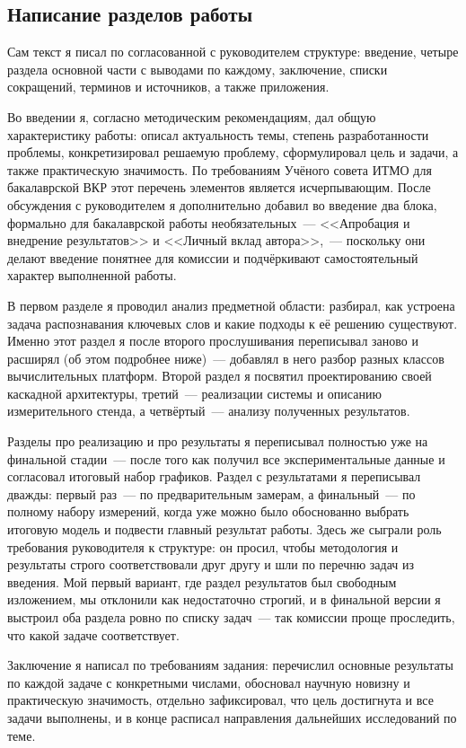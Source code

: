 \subsection{Написание разделов работы}

Сам текст я писал по согласованной с руководителем структуре: введение,
четыре раздела основной части с выводами по каждому, заключение, списки
сокращений, терминов и источников, а также приложения.

Во введении я, согласно методическим рекомендациям, дал общую
характеристику работы: описал актуальность темы, степень разработанности
проблемы, конкретизировал решаемую проблему, сформулировал цель и задачи,
а также практическую значимость. По требованиям Учёного совета ИТМО для
бакалаврской ВКР этот перечень элементов является исчерпывающим. После
обсуждения с руководителем я дополнительно добавил во введение два блока,
формально для бакалаврской работы необязательных~--- <<Апробация и
внедрение результатов>> и <<Личный вклад автора>>,~--- поскольку они
делают введение понятнее для комиссии и подчёркивают самостоятельный
характер выполненной работы.

В первом разделе я проводил анализ предметной области: разбирал, как
устроена задача распознавания ключевых слов и какие подходы к её
решению существуют. Именно этот раздел я после второго прослушивания
переписывал заново и расширял (об этом подробнее ниже)~--- добавлял в
него разбор разных классов вычислительных платформ. Второй раздел я
посвятил проектированию своей каскадной архитектуры, третий~---
реализации системы и описанию измерительного стенда, а четвёртый~---
анализу полученных результатов.

Разделы про реализацию и про результаты я переписывал полностью уже на
финальной стадии~--- после того как получил все экспериментальные
данные и согласовал итоговый набор графиков. Раздел с результатами я
переписывал дважды: первый раз~--- по предварительным замерам, а
финальный~--- по полному набору измерений, когда уже можно было
обоснованно выбрать итоговую модель и подвести главный результат
работы. Здесь же сыграли роль требования руководителя к структуре: он
просил, чтобы методология и результаты строго соответствовали друг
другу и шли по перечню задач из введения. Мой первый вариант, где
раздел результатов был свободным изложением, мы отклонили как
недостаточно строгий, и в финальной версии я выстроил оба раздела
ровно по списку задач~--- так комиссии проще проследить, что какой
задаче соответствует.

Заключение я написал по требованиям задания: перечислил основные
результаты по каждой задаче с конкретными числами, обосновал научную
новизну и практическую значимость, отдельно зафиксировал, что цель
достигнута и все задачи выполнены, и в конце расписал направления
дальнейших исследований по теме.

